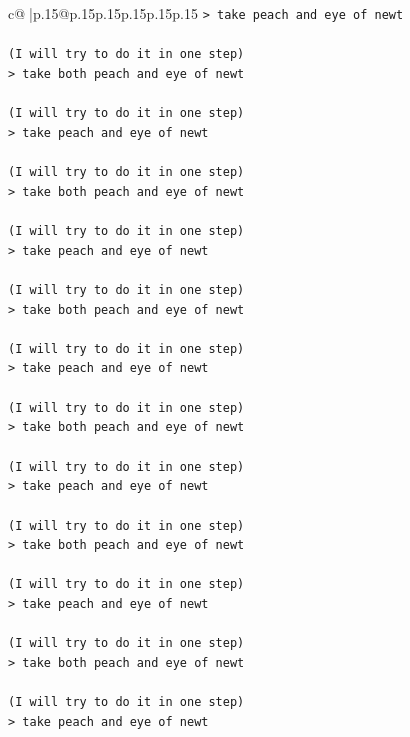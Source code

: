 \documentclass{article}
\begin{document}
{\begin{supertabular}{c@{$\;$}|p{.15\linewidth}@{}p{.15\linewidth}p{.15\linewidth}p{.15\linewidth}p{.15\linewidth}p{.15\linewidth}}
{{{\texttt{> take peach and eye of newt } \\
\\ 
\texttt{(I will try to do it in one step) } \\
\texttt{> take both peach and eye of newt } \\
\\ 
\texttt{(I will try to do it in one step) } \\
\texttt{> take peach and eye of newt } \\
\\ 
\texttt{(I will try to do it in one step) } \\
\texttt{> take both peach and eye of newt } \\
\\ 
\texttt{(I will try to do it in one step) } \\
\texttt{> take peach and eye of newt } \\
\\ 
\texttt{(I will try to do it in one step) } \\
\texttt{> take both peach and eye of newt } \\
\\ 
\texttt{(I will try to do it in one step) } \\
\texttt{> take peach and eye of newt } \\
\\ 
\texttt{(I will try to do it in one step) } \\
\texttt{> take both peach and eye of newt } \\
\\ 
\texttt{(I will try to do it in one step) } \\
\texttt{> take peach and eye of newt } \\
\\ 
\texttt{(I will try to do it in one step) } \\
\texttt{> take both peach and eye of newt } \\
\\ 
\texttt{(I will try to do it in one step) } \\
\texttt{> take peach and eye of newt } \\
\\ 
\texttt{(I will try to do it in one step) } \\
\texttt{> take both peach and eye of newt } \\
\\ 
\texttt{(I will try to do it in one step) } \\
\texttt{> take peach and eye of newt } \\
}}}
\end{supertabular}}
\end{document}

